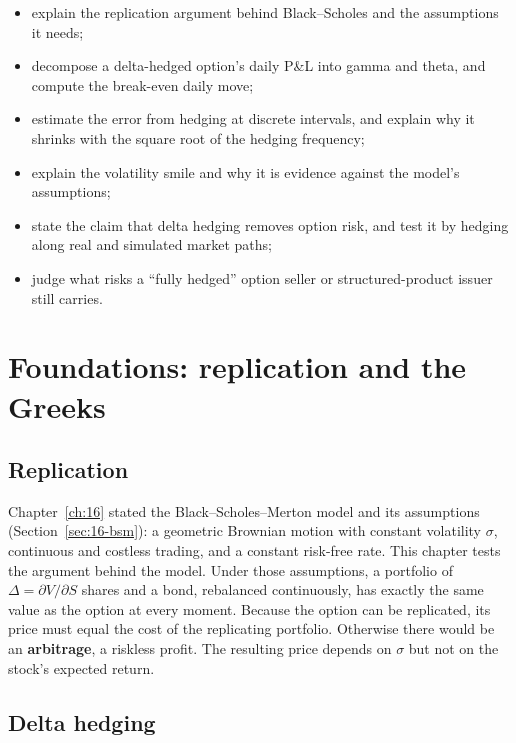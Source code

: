 \begin{itemize}
  \item explain the replication argument behind Black--Scholes and the assumptions it needs;
  \item decompose a delta-hedged option's daily P\&L into gamma and theta, and compute the break-even daily move;
  \item estimate the error from hedging at discrete intervals, and explain why it shrinks with the square root of the hedging frequency;
  \item explain the volatility smile and why it is evidence against the model's assumptions;
  \item state the claim that delta hedging removes option risk, and test it by hedging along real and simulated market paths;
  \item judge what risks a ``fully hedged'' option seller or structured-product issuer still carries.
\end{itemize}

\section{Foundations: replication and the Greeks}
\label{sec:17-foundations}

\subsection{Replication}

Chapter~\ref{ch:16} stated the Black--Scholes--Merton model and its assumptions (Section~\ref{sec:16-bsm}): a geometric Brownian motion with constant volatility $\sigma$, continuous and costless trading, and a constant risk-free rate. This chapter tests the argument behind the model. Under those assumptions, a portfolio of $\Delta = \partial V/\partial S$ shares and a bond, rebalanced continuously, has exactly the same value as the option at every moment. Because the option can be replicated, its price must equal the cost of the replicating portfolio. Otherwise there would be an \textbf{arbitrage}, a riskless profit. The resulting price depends on $\sigma$ but not on the stock's expected return.

\subsection{Delta hedging}

